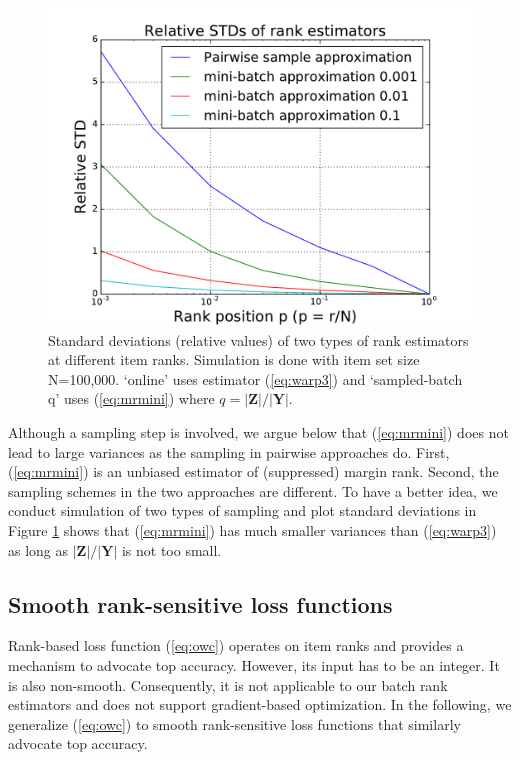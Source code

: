 \documentclass[letterpaper]{article}
\begin{document}
\begin{figure}%
\centering
\includegraphics[width=0.89\columnwidth]{pics/std-eps-converted-to}
\caption{Standard deviations (relative values) of two types of rank estimators at different item ranks. Simulation is done with item set size N=100,000. `online' uses estimator (\ref{eq:warp3}) and `sampled-batch q' uses (\ref{eq:mrmini}) where $q=|\textbf{Z}|/|\textbf{Y}|$.}
\label{pic:std}
\end{figure}


Although a sampling step is involved, we argue below that (\ref{eq:mrmini}) does not lead to large variances as the sampling in pairwise approaches do. First, (\ref{eq:mrmini}) is an unbiased estimator of (suppressed) margin rank. Second, the sampling schemes in the two approaches are different. To have a better idea, we conduct simulation of two types of sampling and plot standard deviations in Figure \ref{pic:std} shows that (\ref{eq:mrmini}) has much smaller variances than (\ref{eq:warp3}) as long as $|\textbf{Z}|/|\textbf{Y}|$ is not too small.



\subsection{Smooth rank-sensitive loss functions}

Rank-based loss function (\ref{eq:owc}) operates on item ranks and provides a mechanism to advocate top accuracy. However, its input has to be an integer. It is also non-smooth. Consequently, it is not applicable to our batch rank estimators and does not support gradient-based optimization. In the following, we generalize (\ref{eq:owc}) to smooth rank-sensitive loss functions that similarly advocate top accuracy.
\end{document}
